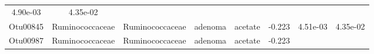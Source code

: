 \documentclass[11pt,]{article}
\begin{document}
\begin{longtable}[]{@{}cccccccc@{}}
\begin{minipage}[t]{0.08\columnwidth}
4.90e-03\strut
\end{minipage} & \begin{minipage}[t]{0.08\columnwidth}\centering\strut
4.35e-02\strut
\end{minipage}\tabularnewline
\begin{minipage}[t]{0.08\columnwidth}\centering\strut
Otu00845\strut
\end{minipage} & \begin{minipage}[t]{0.15\columnwidth}\centering\strut
Ruminococcaceae\strut
\end{minipage} & \begin{minipage}[t]{0.15\columnwidth}\centering\strut
Ruminococcaceae\strut
\end{minipage} & \begin{minipage}[t]{0.08\columnwidth}\centering\strut
adenoma\strut
\end{minipage} & \begin{minipage}[t]{0.09\columnwidth}\centering\strut
acetate\strut
\end{minipage} & \begin{minipage}[t]{0.07\columnwidth}\centering\strut
-0.223\strut
\end{minipage} & \begin{minipage}[t]{0.08\columnwidth}\centering\strut
4.51e-03\strut
\end{minipage} & \begin{minipage}[t]{0.08\columnwidth}\centering\strut
4.35e-02\strut
\end{minipage}\tabularnewline
\begin{minipage}[t]{0.08\columnwidth}\centering\strut
Otu00987\strut
\end{minipage} & \begin{minipage}[t]{0.15\columnwidth}\centering\strut
Ruminococcaceae\strut
\end{minipage} & \begin{minipage}[t]{0.15\columnwidth}\centering\strut
Ruminococcaceae\strut
\end{minipage} & \begin{minipage}[t]{0.08\columnwidth}\centering\strut
adenoma\strut
\end{minipage} & \begin{minipage}[t]{0.09\columnwidth}\centering\strut
acetate\strut
\end{minipage} & \begin{minipage}[t]{0.07\columnwidth}\centering\strut
-0.223\strut
\end{minipage} & \begin{minipage}[t]{0.08\columnwidth}\centering\strut

\end{minipage}
\end{longtable}
\end{document}
